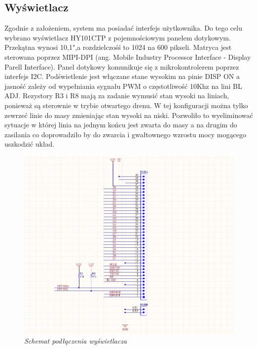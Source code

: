 \documentclass[eng,printmode]{mgr}
\begin{document}
\subsection*{Wyświetlacz}
Zgodnie z założeniem, system ma posiadać interfejs  użytkownika. Do tego celu wybrano wyświetlacz HY101CTP z pojemnościowym panelem dotykowym. Przekątna wynosi 10,1",a rozdzielczośś to 1024 na 600 pikseli. Matryca jest sterowana poprzez MIPI-DPI (ang. Mobile Industry Processor Interface - Display Parell Interface). Panel dotykowy komunikuje się z mikrokontrolerem poprzez interfejs I2C. Podświetlenie jest włączane stane wysokim na pinie DISP ON a jasność zależy od wypełniania sygnału PWM o częstotliwość 10Khz na lini BL ADJ.
Rezystory R3 i R8 mają za zadanie wymusić stan wysoki na liniach, ponieważ są sterownie w trybie otwartego drenu. W tej konfiguracji można tylko zewrzeć linie do masy zmieniając stan wysoki na niski. Pozwoliło to wyeliminować sytuacje w której linia na jednym końcu jest zwarta do masy a na drugim do zasilania co doprowadziło by do zwarcia i gwałtownego wzrostu mocy mogącego uszkodzić układ.
\begin{figure}[!h]
    \centering
    \includegraphics[width=\textwidth]{schematics/display.png}
    \caption{\textit{ Schemat podłączenia wyświetlacza}}
\end{figure}
\end{document}
